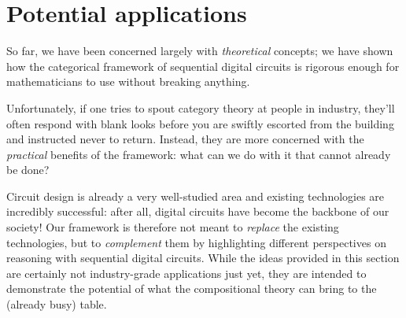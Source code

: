 \chapter{Potential applications}

So far, we have been concerned largely with \emph{theoretical} concepts; we have
shown how the categorical framework of sequential digital circuits is rigorous
enough for mathematicians to use without breaking anything.

Unfortunately, if one tries to spout category theory at people in industry,
they'll often respond with blank looks before you are swiftly escorted from the
building and instructed never to return.
Instead, they are more concerned with the \emph{practical} benefits of the
framework: what can we do with it that cannot already be done?

Circuit design is already a very well-studied area and existing technologies are
incredibly successful: after all, digital circuits have become the backbone of
our society!
Our framework is therefore not meant to \emph{replace} the existing
technologies, but to \emph{complement} them by highlighting different
perspectives on reasoning with sequential digital circuits.
While the ideas provided in this section are certainly not industry-grade
applications just yet, they are intended to demonstrate the potential of what
the compositional theory can bring to the (already busy) table.







